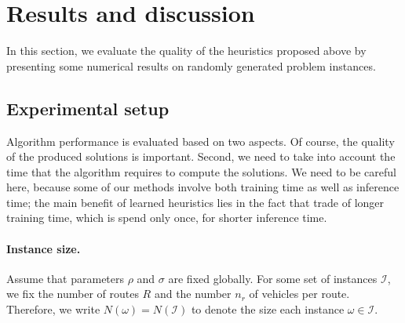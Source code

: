 \documentclass{report}
\theoremstyle{definition}
\theoremstyle{plain}
\begin{document}
\section{Results and discussion}\label{sec:results}

In this section, we evaluate the quality of the heuristics proposed above by
presenting some numerical results on randomly generated problem instances.

\subsection{Experimental setup}

Algorithm performance is evaluated based on two aspects. Of course, the
quality of the produced solutions is important. Second, we need to take into
account the time that the algorithm requires to compute the solutions. We need
to be careful here, because some of our methods involve both training time as
well as inference time; the main benefit of learned heuristics lies in the fact
that trade of longer training time, which is spend only once, for shorter
inference time.


\paragraph{Instance size.}
Assume that parameters $\rho$ and $\sigma$ are fixed globally.
%
For some set of instances $\mathcal{I}$, we fix the number of routes $R$ and the
number $n_r$ of vehicles per route. Therefore, we write
$N(\omega) = N(\mathcal{I})$ to denote the size each instance
$\omega \in \mathcal{I}$.

\end{document}
